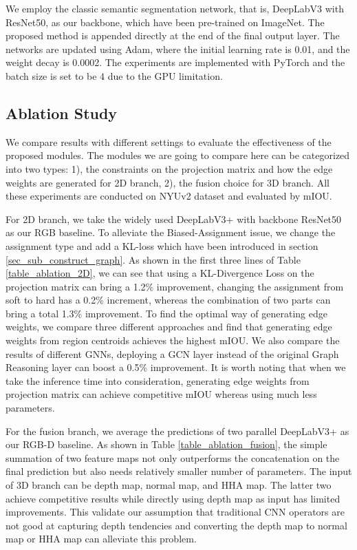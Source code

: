 ﻿\documentclass[journal]{IEEEtran}
\begin{document}
    We employ the classic semantic segmentation network, that is, DeepLabV3 with ResNet50, as our backbone, which have been pre-trained on ImageNet. The proposed method is appended directly at the end of the final output layer. The networks are updated using Adam, where the initial learning rate is 0.01, and the weight decay is 0.0002. The experiments are implemented with PyTorch and the batch size is set to be 4 due to the GPU limitation.

    \subsection{Ablation Study}\label{sec_sub_ablation_study} 
    We compare results with different settings to evaluate the effectiveness of the proposed modules. The modules we are going to compare here can be categorized into two types: 1), the constraints on the projection matrix and how the edge weights are generated for 2D branch, 2), the fusion choice for 3D branch. All these experiments are conducted on NYUv2 dataset and evaluated by mIOU. 
    
    For 2D branch, we take the widely used DeepLabV3+ with backbone ResNet50 as our RGB baseline. To alleviate the Biased-Assignment issue, we change the assignment type and add a KL-loss which have been introduced in section \ref{sec_sub_construct_graph}. As shown in the first three lines of Table \ref{table_ablation_2D}, we can see that using a KL-Divergence Loss on the projection matrix can bring a 1.2\% improvement, changing the assignment from soft to hard has a 0.2\% increment, whereas the combination of two parts can bring a total 1.3\% improvement. To find the optimal way of generating edge weights, we compare three different approaches and find that generating edge weights from region centroids achieves the highest mIOU. We also compare the results of different GNNs, deploying a GCN layer instead of the original Graph Reasoning layer can boost a 0.5\% improvement. It is worth noting that when we take the inference time into consideration, generating edge weights from projection matrix can achieve competitive mIOU whereas using much less parameters. 

    For the fusion branch, we average the predictions of two parallel DeepLabV3+ as our RGB-D baseline. As shown in Table \ref{table_ablation_fusion}, the simple summation of two feature maps not only outperforms the concatenation on the final prediction but also needs relatively smaller number of parameters. The input of 3D branch can be depth map, normal map, and HHA map. The latter two achieve competitive results while directly using depth map as input has limited improvements. This validate our assumption that traditional CNN operators are not good at capturing depth tendencies and converting the depth map to normal map or HHA map can alleviate this problem.
\end{document}
